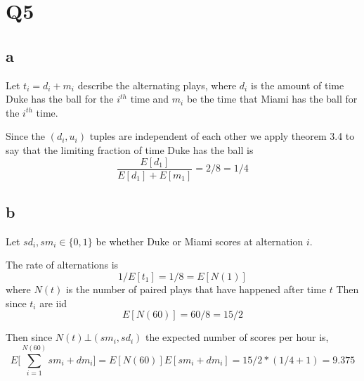 \documentclass{article}
\begin{document}
\section*{Q5}
\subsection*{a}
Let $t_i = d_i + m_i$ describe the alternating plays, where $d_i$ is the amount of time Duke has the ball for the $i^{th}$ time and $m_i$ be the time that Miami has the ball for the $i^{th}$ time. 

Since the $(d_i,u_i)$ tuples are independent of each other we apply theorem 3.4 to say that the limiting fraction of time Duke has the ball is
$$
\frac{E[d_1]}{E[d_1] + E[m_1]} = 2 / 8 = 1/4
$$

\subsection{b}


Let $sd_i, sm_i \in \{0,1\}$ be whether Duke or Miami scores at alternation $i$.

The rate of alternations is 
$$
1/E[t_1] = 1/8 = E[N(1)]
$$
where $N(t)$ is the number of paired plays that have happened after time $t$
Then since $t_i$ are iid
$$
E[N(60)] = 60/8 = 15/2
$$

Then since $N(t) \bot (sm_i, sd_i)$ the expected number of scores per hour is,
$$
E \bigg[\sum_{i=1}^{N(60)} sm_i + dm_i \bigg] = E[N(60)]E[sm_i + dm_i] = 15/2 * (1/4 + 1) = 9.375
$$
\end{document}
